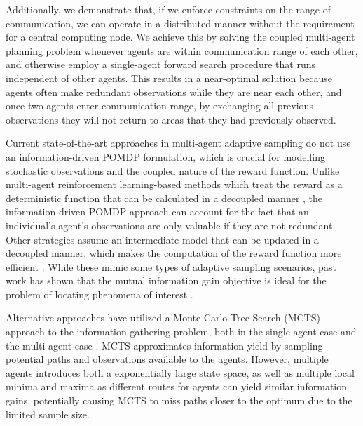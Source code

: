 \documentclass[letterpaper, 10 pt, conference]{IEEEConference}
\begin{document}

Additionally, we demonstrate that, if we enforce constraints on the range of communication, we can operate in a distributed manner without the requirement for a central computing node. We achieve this by solving the coupled multi-agent planning problem whenever agents are within communication range of each other, and otherwise employ a single-agent forward search procedure that runs independent of other agents. This results in a near-optimal solution because agents often make redundant observations while they are near each other, and once two agents enter communication range, by exchanging all previous observations they will not return to areas that they had previously observed.

Current state-of-the-art approaches in multi-agent adaptive sampling do not use an information-driven POMDP formulation, which is crucial for modelling stochastic observations and the coupled nature of the reward function. Unlike multi-agent reinforcement learning-based methods which treat the reward as a deterministic function that can be calculated in a decoupled manner \cite{multi-rl-infomapf, proteins, MAAS}, the information-driven POMDP approach can account for the fact that an individual's agent's observations are only valuable if they are not redundant. Other strategies assume an intermediate model that can be updated in a decoupled manner, which makes the computation of the reward function more efficient \cite{bone2023decentralised, multi-agent-rrt, dec-pomdp}. While these mimic some types of adaptive sampling scenarios, past work has shown that the mutual information gain objective is ideal for the problem of locating phenomena of interest \cite{near-optimal-sampling, only-2-agents, single-agent-boat}. 

Alternative approaches have utilized a Monte-Carlo Tree Search (MCTS) approach to the information gathering problem, both in the single-agent case \cite{Ayton2017RiskboundedAI} and the multi-agent case \cite{bone2023decentralised}. MCTS approximates information yield by sampling potential paths and observations available to the agents. However, multiple agents introduces both a exponentially large state space, as well as multiple local minima and maxima as different routes for agents can yield similar information gains, potentially causing MCTS to miss paths closer to the optimum due to the limited sample size.
\end{document}
